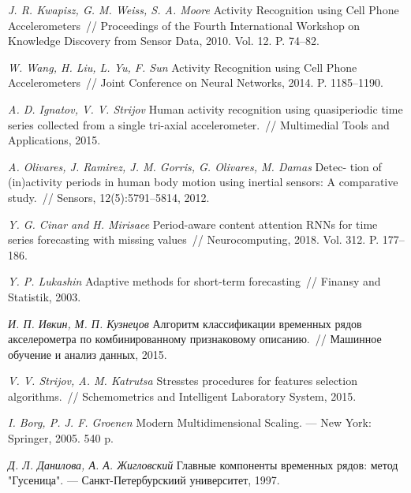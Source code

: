\documentclass[12pt, twoside]{article}
\numberwithin{equation}{section}
\begin{document}
\begin{thebibliography}{99}
	\textit{J. R. Kwapisz, G. M. Weiss, S. A. Moore} Activity Recognition using Cell Phone Accelerometers~// Proceedings of the Fourth International Workshop on Knowledge Discovery from Sensor Data, 2010. Vol. 12. P. 74--82.
	
	\textit{W. Wang, H. Liu, L. Yu, F. Sun} Activity Recognition using Cell Phone Accelerometers~// Joint Conference on Neural Networks, 2014. P. 1185--1190.
	
	\textit{A. D. Ignatov, V. V. Strijov} Human activity recognition using quasiperiodic time series collected from a single tri-axial accelerometer.~// Multimedial Tools and Applications, 2015.
	
	\textit{A. Olivares, J. Ramirez, J. M. Gorris, G. Olivares, M. Damas} Detec- tion of (in)activity periods in human body motion using inertial sensors: A comparative study.~// Sensors, 12(5):5791–5814, 2012.
	
	\textit{Y. G. Cinar and H. Mirisaee} Period-aware content attention RNNs for time series forecasting with missing values~// Neurocomputing, 2018. Vol. 312. P. 177--186.
	
	\textit{Y. P. Lukashin} Adaptive methods for short-term forecasting~// Finansy and Statistik, 2003.
	
	\textit{И. П. Ивкин,  М. П. Кузнецов} Алгоритм классификации временных рядов акселерометра по комбинированному признаковому описанию.~// Машинное обучение и анализ данных, 2015.
	
	\textit{V. V. Strijov, A. M. Katrutsa} Stresstes procedures for features selection algorithms.~// Schemometrics and Intelligent Laboratory System, 2015.
	
	\textit{I. Borg, P. J. F. Groenen} Modern Multidimensional Scaling. --- New York: Springer, 2005. 540 p.
	
	
	\textit{Д. Л. Данилова, А. А. Жигловский} Главные компоненты временных рядов: метод "Гусеница". --- Санкт-Петербурскиий университет, 1997.
	

	
\end{thebibliography}
\end{document}
